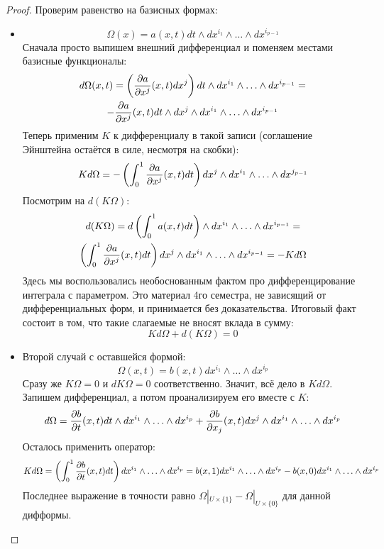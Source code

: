 \begin{proof}
	Проверим равенство на базисных формах:
	\begin{itemize}
		\item \[
			\Omega(x) = a(x, t) dt \wedge dx^{i_1} \wedge \ldots \wedge dx^{i_{p - 1}}
		\]
		Сначала просто выпишем внешний дифференциал и поменяем местами базисные функционалы:
		\begin{multline*}
			d\Omega(x, t) = \left(\frac{\partial a}{\partial x^j}(x, t) dx^{j}\right) dt \wedge dx^{i_1} \wedge \ldots \wedge dx^{i_{p - 1}} =
			\\
			-\frac{\partial a}{\partial x^j}(x, t) dt \wedge dx^j \wedge dx^{i_1} \wedge \ldots \wedge dx^{i_{p - 1}}
		\end{multline*}
		Теперь применим $K$ к дифференциалу в такой записи (соглашение Эйнштейна остаётся в силе, несмотря на скобки):
		\[
			Kd\Omega = -\left(\int_0^1 \frac{\partial a}{\partial x^j}(x, t)dt\right) dx^j \wedge dx^{i_1} \wedge \ldots \wedge dx^{j_{p - 1}}
		\]
		Посмотрим на $d(K\Omega)$:
		\begin{multline*}
			d(K\Omega) = d\left(\int_0^1 a(x, t) dt\right) \wedge dx^{i_1} \wedge \ldots \wedge dx^{i_{p - 1}} =
			\\
			\left(\int_0^1 \frac{\partial a}{\partial x^j}(x, t) dt\right) dx^j \wedge dx^{i_1} \wedge \ldots \wedge dx^{i_{p - 1}} = -Kd\Omega
		\end{multline*}
		Здесь мы воспользовались необоснованным фактом про дифференцирование интеграла с параметром. Это материал 4го семестра, не зависящий от дифференциальных форм, и принимается без доказательства. Итоговый факт состоит в том, что такие слагаемые не вносят вклада в сумму:
		\[
			Kd\Omega + d(K\Omega) = 0
		\]
		
		\item Второй случай с оставшейся формой:
		\[
			\Omega(x, t) = b(x, t)dx^{i_1} \wedge \ldots \wedge dx^{i_p}
		\]
		Сразу же $K\Omega = 0$ и $dK\Omega = 0$ соответственно. Значит, всё дело в $Kd\Omega$. Запишем дифференциал, а потом проанализируем его вместе с $K$:
		\[
			d\Omega = \frac{\partial b}{\partial t}(x, t) dt \wedge dx^{i_1} \wedge \ldots \wedge dx^{i_p} + \frac{\partial b}{\partial x_j}(x, t) dx^j \wedge dx^{i_1} \wedge \ldots \wedge dx^{i_p}
		\]
		Осталось применить оператор:
		\[
			Kd\Omega = \left(\int_0^1 \frac{\partial b}{\partial t}(x, t)dt\right) dx^{i_1} \wedge \ldots \wedge dx^{i_p} = b(x, 1)dx^{i_1} \wedge \ldots \wedge dx^{i_p} - b(x, 0)dx^{i_1} \wedge \ldots \wedge dx^{i_p}
		\]
		Последнее выражение в точности равно $\Omega|_{U \times \{1\}} - \Omega|_{U \times \{0\}}$ для данной дифформы.
	\end{itemize}
\end{proof}

